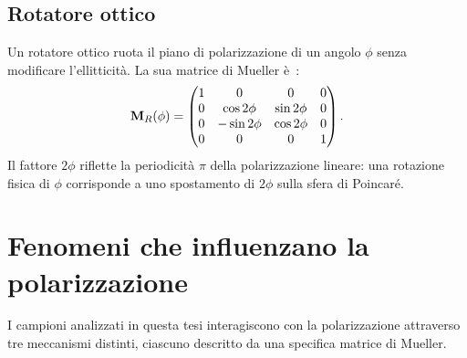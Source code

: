 \subsection{Rotatore ottico}
\label{subsec:mueller_rotatore}

Un rotatore ottico ruota il piano di polarizzazione di un angolo $\phi$ senza modificare l'ellitticità. La sua matrice di Mueller è~\cite{goldstein2011polarized}:
\begin{equation}
\label{eq:mueller_rotatore}
\mathbf{M}_R(\phi) = \begin{pmatrix} 1 & 0 & 0 & 0 \\ 0 & \cos 2\phi & \sin 2\phi & 0 \\ 0 & -\sin 2\phi & \cos 2\phi & 0 \\ 0 & 0 & 0 & 1 \end{pmatrix}.
\end{equation}
Il fattore $2\phi$ riflette la periodicità $\pi$ della polarizzazione lineare: una rotazione fisica di $\phi$ corrisponde a uno spostamento di $2\phi$ sulla sfera di Poincaré.


\section{Fenomeni che influenzano la polarizzazione}
\label{sec:fenomeni}

I campioni analizzati in questa tesi interagiscono con la polarizzazione attraverso tre meccanismi distinti, ciascuno descritto da una specifica matrice di Mueller.

